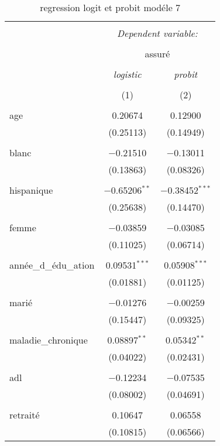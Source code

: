 \documentclass[
  14pt,
  french,
]{article}
\begin{document}
\begin{table}[!htbp] \centering 
  \caption{regression logit et probit modéle 7} 
  \label{} 
\tiny 
\begin{tabular}{@{\extracolsep{5pt}}lcc} 
\\[-1.8ex]\hline 
\hline \\[-1.8ex] 
 & \multicolumn{2}{c}{\textit{Dependent variable:}} \\ 
\cline{2-3} 
\\[-1.8ex] & \multicolumn{2}{c}{assuré} \\ 
\\[-1.8ex] & \textit{logistic} & \textit{probit} \\ 
\\[-1.8ex] & (1) & (2)\\ 
\hline \\[-1.8ex] 
 age & 0.20674 & 0.12900 \\ 
  & (0.25113) & (0.14949) \\ 
  & & \\ 
 blanc & $-$0.21510 & $-$0.13011 \\ 
  & (0.13863) & (0.08326) \\ 
  & & \\ 
 hispanique & $-$0.65206$^{**}$ & $-$0.38452$^{***}$ \\ 
  & (0.25638) & (0.14470) \\ 
  & & \\ 
 femme & $-$0.03859 & $-$0.03085 \\ 
  & (0.11025) & (0.06714) \\ 
  & & \\ 
 année\_d\_édu\_ation & 0.09531$^{***}$ & 0.05908$^{***}$ \\ 
  & (0.01881) & (0.01125) \\ 
  & & \\ 
 marié & $-$0.01276 & $-$0.00259 \\ 
  & (0.15447) & (0.09325) \\ 
  & & \\ 
 maladie\_chronique & 0.08897$^{**}$ & 0.05342$^{**}$ \\ 
  & (0.04022) & (0.02431) \\ 
  & & \\ 
 adl & $-$0.12234 & $-$0.07535 \\ 
  & (0.08002) & (0.04691) \\ 
  & & \\ 
 retraité & 0.10647 & 0.06558 \\ 
  & (0.10815) & (0.06566) \\ 

\end{tabular}
\end{table}
\end{document}
